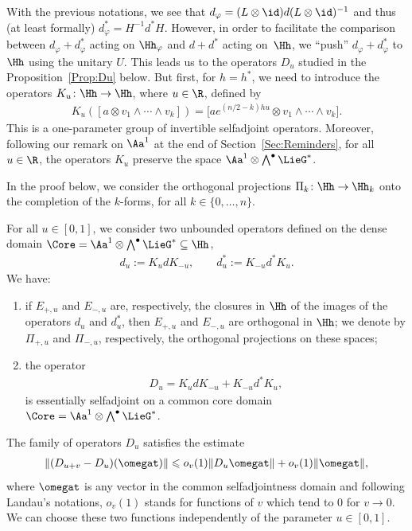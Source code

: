 With the previous notations, we see that $d_\varphi = (L \otimes \id) d (L \otimes \id)^{-1}$ and thus (at least formally) $d_\varphi^* = H^{-1} d^* H$. However, in order to facilitate the comparison between $d_\varphi + d^*_\varphi$ acting on $\Hh_\varphi$ and $d + d^*$ acting on~$\Hh$, we ``push'' $d_\varphi + d_\varphi^*$ to $\Hh$ using the unitary $U$. This leads us to the operators $D_u$ studied in the Proposition~\ref{Prop:Du} below. But f\/irst, for $h = h^*$, we need to introduce the operators $K_{u} \colon \Hh \to \Hh$, where $u \in \R$, def\/ined by
\begin{gather}
\label{Eqn:DefKu}
K_{u}( [a \otimes v_1 \wedge \cdots \wedge v_k ]) = \big[a e^{(n/2 - k)h u} \otimes v_1 \wedge \cdots \wedge v_k\big].
\end{gather}
This is a one-parameter group of invertible selfadjoint operators. Moreover, following our remark on $\Aa^1$ at the end of Section~\ref{Sec:Reminders}, for all $u \in \R$, the operators $K_u$ preserve the space $\Aa^1 \otimes \bigwedge^\bullet \LieG^*$.

In the proof below, we consider the orthogonal projections $\Pi_k \colon \Hh \to \Hh_k$ onto the completion of the $k$-forms, for all $k \in \{0, \ldots, n \}$.
\begin{Proposition}
\label{Prop:Du}
For all $u \in [0,1]$, we consider two unbounded operators defined on the dense domain $\Core = \Aa^1 \otimes \bigwedge^\bullet \LieG^* \subseteq \Hh$,
\begin{gather*}
d_u := K_{u} d K_{-u},
\qquad
d_u^* := K_{-u} d^* K_{u}.
\end{gather*}
We have:
\begin{enumerate}\itemsep=0pt
\item[$(1)$] %
if $E_{+,u}$ and $E_{-, u}$ are, respectively, the closures in $\Hh$ of the images of the operators $d_u$ and $d_u^*$, then $E_{+,u}$ and $E_{-, u}$ are orthogonal in $\Hh$; we denote by $\Pi_{+,u}$ and $\Pi_{-,u}$, respectively, the orthogonal projections on these spaces;
\item[$(2)$] %
the operator
\begin{gather*}
D_{u} = K_{u} d K_{-u} + K_{-u} d^* K_{u},
\end{gather*}
is essentially selfadjoint on a common core domain $\Core = \Aa^1 \otimes \bigwedge^\bullet \LieG^*$.
\end{enumerate}
The family of operators $D_u$ satisfies the estimate
\begin{gather}
\label{Eqn:EstimateDu}
\| (D_{u+v} - D_u)(\omegat) \| \leqslant o_v(1) \| D_u \omegat \| + o_v(1) \| \omegat \|,
\end{gather}
where $\omegat$ is any vector in the common selfadjointness domain and following Landau's notations, $o_v(1)$ stands for functions of $v$ which tend to $0$ for $v \to 0$. We can choose these two functions independently of the parameter $u \in [0,1]$.
\end{Proposition}

